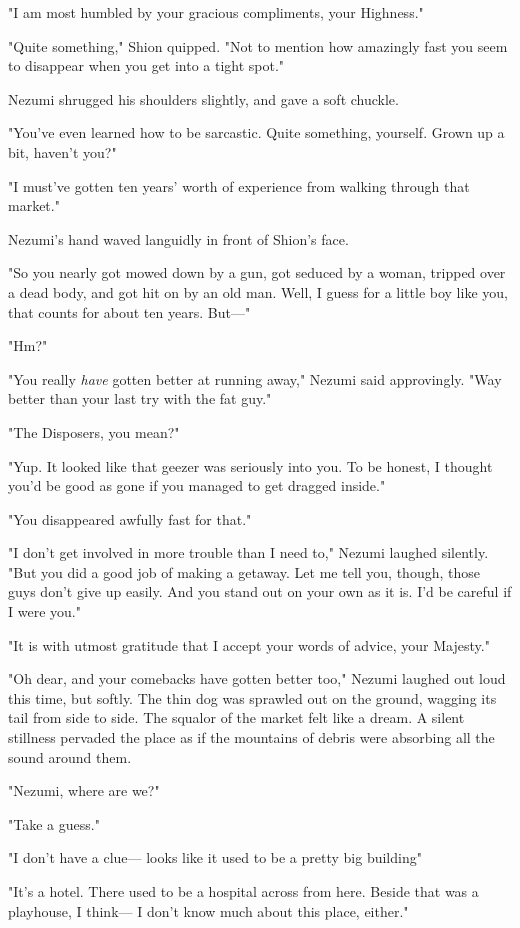 "I am most humbled by your gracious compliments, your Highness."

"Quite something," Shion quipped. "Not to mention how amazingly fast you
seem to disappear when you get into a tight spot."

Nezumi shrugged his shoulders slightly, and gave a soft chuckle.

"You've even learned how to be sarcastic. Quite something, yourself.
Grown up a bit, haven't you?"

"I must've gotten ten years' worth of experience from walking through
that market."

Nezumi's hand waved languidly in front of Shion's face.

"So you nearly got mowed down by a gun, got seduced by a woman, tripped
over a dead body, and got hit on by an old man. Well, I guess for a
little boy like you, that counts for about ten years. But---"

"Hm?"

"You really \emph{have} gotten better at running away," Nezumi said
approvingly. "Way better than your last try with the fat guy."

"The Disposers, you mean?"

"Yup. It looked like that geezer was seriously into you. To be honest, I
thought you'd be good as gone if you managed to get dragged inside."

"You disappeared awfully fast for that."

"I don't get involved in more trouble than I need to," Nezumi laughed
silently. "But you did a good job of making a getaway. Let me tell you,
though, those guys don't give up easily. And you stand out on your own
as it is. I'd be careful if I were you."

"It is with utmost gratitude that I accept your words of advice, your
Majesty."

"Oh dear, and your comebacks have gotten better too," Nezumi laughed out
loud this time, but softly. The thin dog was sprawled out on the ground,
wagging its tail from side to side. The squalor of the market felt like
a dream. A silent stillness pervaded the place as if the mountains of
debris were absorbing all the sound around them.

"Nezumi, where are we?"

"Take a guess."

"I don't have a clue--- looks like it used to be a pretty big building\el "

"It's a hotel. There used to be a hospital across from here. Beside that
was a playhouse, I think--- I don't know much about this place, either."

